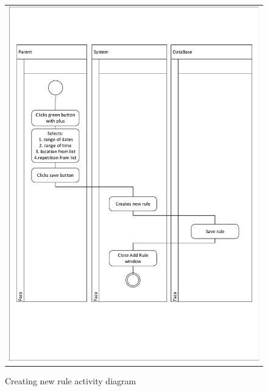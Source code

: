 \documentclass{sprawozdanie-agh}
\begin{document}
			\begin{figure}[H]
				\centering
				\begin{tabular}{c}
					\includegraphics[width=.95\textwidth]{crudCreate_cropped} 
				\end{tabular}
			\caption{Creating new rule activity diagram}
			\end{figure}
\end{document}
